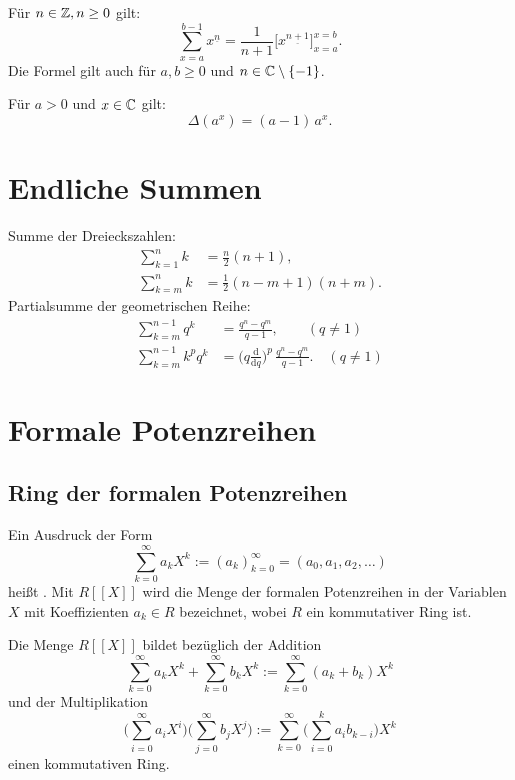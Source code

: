 Für $n\in\mathbb Z,n\ge 0$ gilt:
\begin{equation}
\sum_{x=a}^{b-1} x^{\underline n} = \frac{1}{n+1}\big[x^{\underline{n+1}}\big]_{x=a}^{x=b}.
\end{equation}
Die Formel gilt auch für $a,b\ge 0$ und $n\in\mathbb C\setminus\{-1\}$.

Für $a>0$ und $x\in\mathbb C$ gilt:
\begin{equation}
\Delta(a^x) = (a-1)\,a^x.
\end{equation}

\section{Endliche Summen}
Summe der Dreieckszahlen:
\begin{align}
\sum_{k=1}^n k &= \frac{n}{2}(n+1),\\
\sum_{k=m}^n k &= \frac{1}{2}(n-m+1)(n+m).
\end{align}
Partialsumme der geometrischen Reihe:
\begin{align}
\sum_{k=m}^{n-1} q^k &= \frac{q^n-q^m}{q-1},\qquad (q\ne 1)\\
\sum_{k=m}^{n-1} k^p q^k
&= \Big(q\frac{\mathrm d}{\mathrm dq}\Big)^p\,\frac{q^n-q^m}{q-1}.\quad (q\ne 1)
\end{align}

\section{Formale Potenzreihen}
\subsection{Ring der formalen Potenzreihen}
\begin{Definition}
Ein Ausdruck der Form
\begin{equation}
\sum_{k=0}^\infty a_k X^k := (a_k)_{k=0}^\infty = (a_0,a_1,a_2,\ldots)
\end{equation}
heißt . Mit $R[[X]]$ wird die Menge
der formalen Potenzreihen in der Variablen $X$ mit Koeffizienten
$a_k\in R$ bezeichnet, wobei $R$ ein kommutativer Ring ist.
\end{Definition}
Die Menge $R[[X]]$ bildet bezüglich der Addition
\begin{equation}
\sum_{k=0}^\infty a_k X^k+\sum_{k=0}^\infty b_k X^k
:= \sum_{k=0}^\infty (a_k+b_k)X^k
\end{equation}
und der Multiplikation
\begin{equation}
\bigg(\sum_{i=0}^\infty a_i X^i\bigg)\bigg(\sum_{j=0}^\infty b_j X^j\bigg)
:= \sum_{k=0}^\infty \bigg(\sum_{i=0}^{k} a_ib_{k-i}\bigg)X^k
\end{equation}
einen kommutativen Ring.

